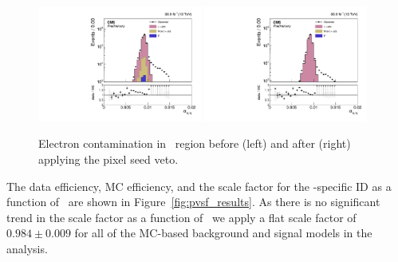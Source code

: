 \begin{figure}[htbp]
  \begin{center}
    \includegraphics[width=0.48\textwidth]{Calibration/Figures/pvsf/gjets_sieie.pdf}
    \includegraphics[width=0.48\textwidth]{Calibration/Figures/pvsf/gjets_sieiePixelVeto.pdf}
    \caption{
      Electron contamination in \gj\ region before (left) and after (right) applying the pixel seed veto.
    }
    \label{fig:pvsf_contam}
  \end{center}
\end{figure}
 
The data efficiency, MC efficiency, and the scale factor for the \Pgg-specific ID as a function of \pt\ are shown in Figure~\ref{fig:pvsf_results}. 
As there is no significant trend in the scale factor as a function of \pt\, we apply a flat scale factor of $0.984 \pm 0.009$ for all of the MC-based background and signal models in the analysis.

